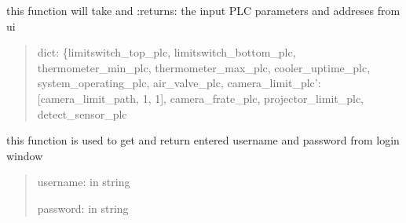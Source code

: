 \documentclass[letterpaper,10pt,english]{sphinxmanual}
\begin{document}
\begin{savenotes}
\begin{fulllineitems}
\begin{savenotes}
\begin{fulllineitems}
\begin{quote}
\begin{description}
\end{description}\end{quote}

\end{fulllineitems}\end{savenotes}


\begin{savenotes}\begin{fulllineitems}
\label{\detokenize{setting/setting_UI:oxin.setting_UI.UI_main_window.get_plc_parms}}
\pysigstartsignatures
{}
\pysigstopsignatures
\sphinxAtStartPar
this function will take and :returns: the input PLC parameters and addreses from ui
\begin{quote}\begin{description}
\sphinxAtStartPar
dict: \{limitswitch\_top\_plc, limitswitch\_bottom\_plc, thermometer\_min\_plc, thermometer\_max\_plc,
cooler\_uptime\_plc, system\_operating\_plc, air\_valve\_plc, camera\_limit\_plc’:{[}camera\_limit\_path, \sphinxhyphen{}1, \sphinxhyphen{}1{]},
camera\_frate\_plc, projector\_limit\_plc, detect\_sensor\_plc

\end{description}\end{quote}

\end{fulllineitems}\end{savenotes}


\begin{savenotes}\begin{fulllineitems}
\label{\detokenize{setting/setting_UI:oxin.setting_UI.UI_main_window.get_user_pass}}
\pysigstartsignatures
{}
\pysigstopsignatures
\sphinxAtStartPar
this function is used to get and return entered username and password from login window
\begin{quote}\begin{description}
\sphinxAtStartPar
username: in string

\sphinxAtStartPar
password: in string


\end{description}
\end{quote}
\end{fulllineitems}
\end{savenotes}
\end{fulllineitems}
\end{savenotes}
\end{document}
